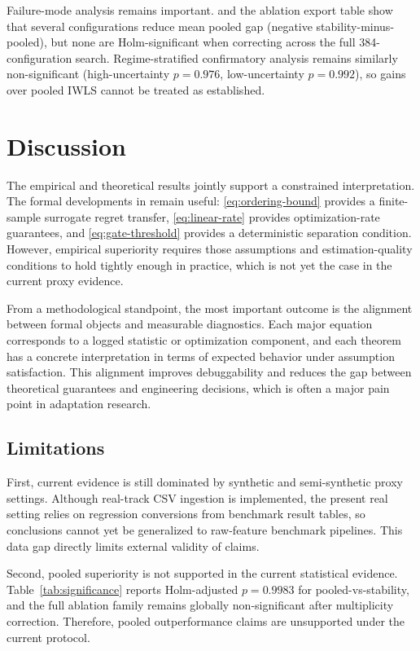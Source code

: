 \documentclass{article} %
\begin{document}
Failure-mode analysis remains important.  and the ablation export table show that several configurations reduce mean pooled gap (negative stability-minus-pooled), but none are Holm-significant when correcting across the full 384-configuration search. Regime-stratified confirmatory analysis remains similarly non-significant (high-uncertainty \(p=0.976\), low-uncertainty \(p=0.992\)), so gains over pooled IWLS cannot be treated as established.

\section{Discussion}
The empirical and theoretical results jointly support a constrained interpretation. The formal developments in  remain useful: \eqref{eq:ordering-bound} provides a finite-sample surrogate regret transfer, \eqref{eq:linear-rate} provides optimization-rate guarantees, and \eqref{eq:gate-threshold} provides a deterministic separation condition. However, empirical superiority requires those assumptions and estimation-quality conditions to hold tightly enough in practice, which is not yet the case in the current proxy evidence.

From a methodological standpoint, the most important outcome is the alignment between formal objects and measurable diagnostics. Each major equation corresponds to a logged statistic or optimization component, and each theorem has a concrete interpretation in terms of expected behavior under assumption satisfaction. This alignment improves debuggability and reduces the gap between theoretical guarantees and engineering decisions, which is often a major pain point in adaptation research.

\subsection{Limitations}
First, current evidence is still dominated by synthetic and semi-synthetic proxy settings. Although real-track CSV ingestion is implemented, the present real setting relies on regression conversions from benchmark result tables, so conclusions cannot yet be generalized to raw-feature benchmark pipelines. This data gap directly limits external validity of claims.

Second, pooled superiority is not supported in the current statistical evidence. Table~\ref{tab:significance} reports Holm-adjusted \(p=0.9983\) for pooled-vs-stability, and the full ablation family remains globally non-significant after multiplicity correction. Therefore, pooled outperformance claims are unsupported under the current protocol.
\end{document}
